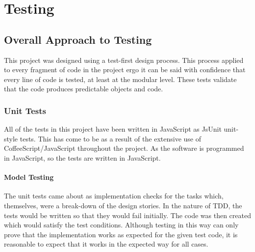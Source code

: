 \cleardoublepage
\chapter{Testing}



\section{Overall Approach to Testing}
This project was designed using a test-first design process. This process applied to every fragment of code in the project ergo it can be said with confidence that every line of code is tested, at least at the modular level. These tests validate that the code produces predictable objects and code.

\subsection{Unit Tests}
All of the tests in this project have been written in Java\-Script as JsUnit unit-style tests. This has come to be as a result of the extensive use of Coffee\-Script\slash Java\-Script throughout the project. As the software is programmed in Java\-Script, so the tests are written in Java\-Script.

\subsubsection{Model Testing}
The unit tests came about as implementation checks for the tasks which, themselves, were a break-down of the design stories. In the nature of TDD, the tests would be written so that they would fail initially. The code was then created which would satisfy the test conditions. Although testing in this way can only prove that the implementation works as expected for the given test code, it is reasonable to expect that it works in the expected way for all cases.

